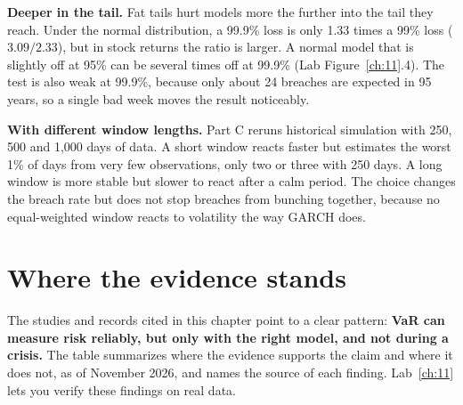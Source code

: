 \textbf{Deeper in the tail.} Fat tails hurt models more the further into the tail they reach. Under the normal distribution, a 99.9\% loss is only 1.33 times a 99\% loss ($3.09/2.33$), but in stock returns the ratio is larger. A normal model that is slightly off at 95\% can be several times off at 99.9\% (Lab Figure~\ref{ch:11}.4). The test is also weak at 99.9\%, because only about 24 breaches are expected in 95 years, so a single bad week moves the result noticeably.

\textbf{With different window lengths.} Part C reruns historical simulation with 250, 500 and 1,000 days of data. A short window reacts faster but estimates the worst 1\% of days from very few observations, only two or three with 250 days. A long window is more stable but slower to react after a calm period. The choice changes the breach rate but does not stop breaches from bunching together, because no equal-weighted window reacts to volatility the way GARCH does.

\section{Where the evidence stands}
\label{sec:11-verdict}

The studies and records cited in this chapter point to a clear pattern: \textbf{VaR can measure risk reliably, but only with the right model, and not during a crisis.} The table summarizes where the evidence supports the claim and where it does not, as of November 2026, and names the source of each finding. Lab~\ref{ch:11} lets you verify these findings on real data.


